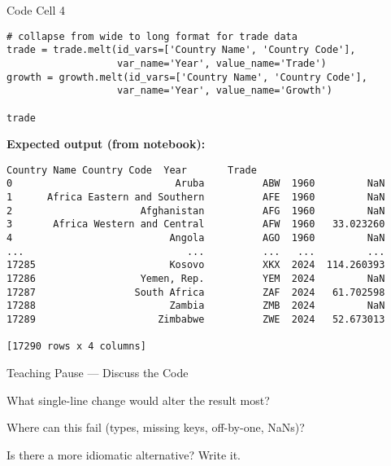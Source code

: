 \documentclass[notes,11pt, aspectratio=169, xcolor=table]{beamer}
\newenvironment{wideitemize}{\itemize\addtolength{\itemsep}{10pt}}{\enditemize}
\begin{document}
\begin{frame}[fragile]{Code Cell 4}
\begin{verbatim}
# collapse from wide to long format for trade data
trade = trade.melt(id_vars=['Country Name', 'Country Code'],
                   var_name='Year', value_name='Trade')
growth = growth.melt(id_vars=['Country Name', 'Country Code'],
                   var_name='Year', value_name='Growth')

trade
\end{verbatim}
\vspace{0.5ex}
\textbf{Expected output (from notebook):}
\begin{verbatim}
Country Name Country Code  Year       Trade
0                            Aruba          ABW  1960         NaN
1      Africa Eastern and Southern          AFE  1960         NaN
2                      Afghanistan          AFG  1960         NaN
3       Africa Western and Central          AFW  1960   33.023260
4                           Angola          AGO  1960         NaN
...                            ...          ...   ...         ...
17285                       Kosovo          XKX  2024  114.260393
17286                  Yemen, Rep.          YEM  2024         NaN
17287                 South Africa          ZAF  2024   61.702598
17288                       Zambia          ZMB  2024         NaN
17289                     Zimbabwe          ZWE  2024   52.673013

[17290 rows x 4 columns]
\end{verbatim}
\end{frame}

\begin{frame}{Teaching Pause — Discuss the Code}
\begin{wideitemize}
\item What single-line change would alter the result most?
\item Where can this fail (types, missing keys, off-by-one, NaNs)?
\item Is there a more idiomatic alternative? Write it.
\end{wideitemize}
\end{frame}
\end{document}
